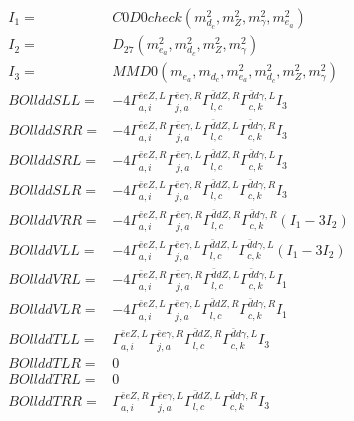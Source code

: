 \documentclass[A4,landscape]{article}
\begin{document}
\begin{align} 
I_1 = & C0D0check(m^2_{d_{{c}}}, m^2_{Z}, m^2_{\gamma}, m^2_{e_{{a}}}) \\ 
I_2 = & D_{27}(m^2_{e_{{a}}}, m^2_{d_{{c}}}, m^2_{Z}, m^2_{\gamma}) \\ 
I_3 = & MMD0(m_{e_{{a}}}, m_{d_{{c}}}, m^2_{e_{{a}}}, m^2_{d_{{c}}}, m^2_{Z}, m^2_{\gamma}) \\ 
  BOllddSLL= & -4  \Gamma^{\bar{e}e Z ,L}_{a, i} \Gamma^{\bar{e}e \gamma ,R}_{j, a} \Gamma^{\bar{d}d Z ,R}_{l, c} \Gamma^{\bar{d}d \gamma ,L}_{c, k} I_3 \\ 
  BOllddSRR= & -4  \Gamma^{\bar{e}e Z ,R}_{a, i} \Gamma^{\bar{e}e \gamma ,L}_{j, a} \Gamma^{\bar{d}d Z ,L}_{l, c} \Gamma^{\bar{d}d \gamma ,R}_{c, k} I_3 \\ 
  BOllddSRL= & -4  \Gamma^{\bar{e}e Z ,R}_{a, i} \Gamma^{\bar{e}e \gamma ,L}_{j, a} \Gamma^{\bar{d}d Z ,R}_{l, c} \Gamma^{\bar{d}d \gamma ,L}_{c, k} I_3 \\ 
  BOllddSLR= & -4  \Gamma^{\bar{e}e Z ,L}_{a, i} \Gamma^{\bar{e}e \gamma ,R}_{j, a} \Gamma^{\bar{d}d Z ,L}_{l, c} \Gamma^{\bar{d}d \gamma ,R}_{c, k} I_3 \\ 
  BOllddVRR= & -4  \Gamma^{\bar{e}e Z ,R}_{a, i} \Gamma^{\bar{e}e \gamma ,R}_{j, a} \Gamma^{\bar{d}d Z ,R}_{l, c} \Gamma^{\bar{d}d \gamma ,R}_{c, k} (I_1 - 3 I_2) \\ 
  BOllddVLL= & -4  \Gamma^{\bar{e}e Z ,L}_{a, i} \Gamma^{\bar{e}e \gamma ,L}_{j, a} \Gamma^{\bar{d}d Z ,L}_{l, c} \Gamma^{\bar{d}d \gamma ,L}_{c, k} (I_1 - 3 I_2) \\ 
  BOllddVRL= & -4  \Gamma^{\bar{e}e Z ,R}_{a, i} \Gamma^{\bar{e}e \gamma ,R}_{j, a} \Gamma^{\bar{d}d Z ,L}_{l, c} \Gamma^{\bar{d}d \gamma ,L}_{c, k} I_1 \\ 
  BOllddVLR= & -4  \Gamma^{\bar{e}e Z ,L}_{a, i} \Gamma^{\bar{e}e \gamma ,L}_{j, a} \Gamma^{\bar{d}d Z ,R}_{l, c} \Gamma^{\bar{d}d \gamma ,R}_{c, k} I_1 \\ 
  BOllddTLL= &  \Gamma^{\bar{e}e Z ,L}_{a, i} \Gamma^{\bar{e}e \gamma ,R}_{j, a} \Gamma^{\bar{d}d Z ,R}_{l, c} \Gamma^{\bar{d}d \gamma ,L}_{c, k} I_3 \\ 
  BOllddTLR= & 0 \\ 
  BOllddTRL= & 0 \\ 
  BOllddTRR= &  \Gamma^{\bar{e}e Z ,R}_{a, i} \Gamma^{\bar{e}e \gamma ,L}_{j, a} \Gamma^{\bar{d}d Z ,L}_{l, c} \Gamma^{\bar{d}d \gamma ,R}_{c, k} I_3 \\ 
\end{align} 
\end{document}
